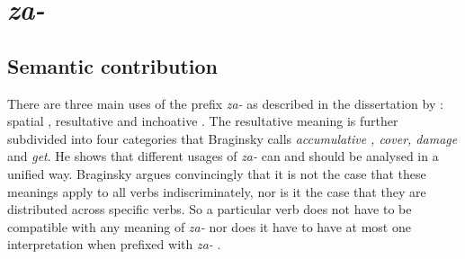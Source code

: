 %


\section{\textit{za-}  }\label{subsection:semantics:za}
\subsection{Semantic contribution}
There are three main uses of the prefix \textit{za-}   as described in the dissertation by \citet{Braginsky:08}: spatial , resultative  and inchoative . The resultative  meaning is further subdivided into four categories that Braginsky calls \textit{accumulative , cover, damage} and \textit{get}. He shows that different usages of \textit{za-}   can and should be analysed in a unified way. Braginsky argues convincingly that it is not the case that these meanings apply to all verbs indiscriminately, nor is it the case that they are distributed across specific verbs. So a particular verb does not have to be compatible with any meaning of \textit{za-}   nor does it have to have at most one interpretation when prefixed with \textit{za-}  .

